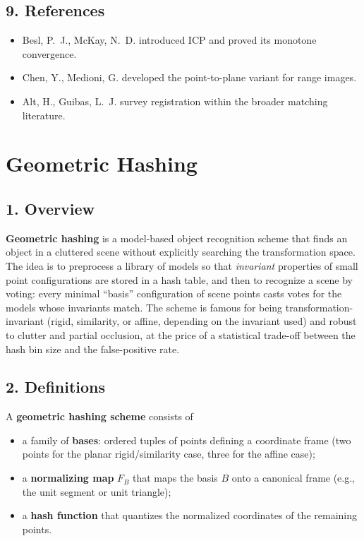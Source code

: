 \subsection{9. References}

\begin{itemize}
\item Besl, P.~J., McKay, N.~D. \cite{besl1992} introduced ICP and proved
  its monotone convergence.
\item Chen, Y., Medioni, G. \cite{chen1992} developed the point-to-plane
  variant for range images.
\item Alt, H., Guibas, L.~J. \cite{alt1999} survey registration within the
  broader matching literature.
\end{itemize}


\section{Geometric Hashing}
\label{sec:matching_hashing}

\subsection{1. Overview}

\textbf{Geometric hashing} \cite{wolfson1997} is a model-based object
recognition scheme that finds an object in a cluttered scene without
explicitly searching the transformation space. The idea is to preprocess a
library of models so that \emph{invariant} properties of small point
configurations are stored in a hash table, and then to recognize a scene by
voting: every minimal ``basis'' configuration of scene points casts votes for
the models whose invariants match. The scheme is famous for being
transformation-invariant (rigid, similarity, or affine, depending on the
invariant used) and robust to clutter and partial occlusion, at the price of
a statistical trade-off between the hash bin size and the false-positive
rate.

\subsection{2. Definitions}

\begin{definition}\label{def:match_geometric_hashing}
  A \textbf{geometric hashing scheme} consists of
  \begin{itemize}
    \item a family of \textbf{bases}: ordered tuples of points defining a
      coordinate frame (two points for the planar rigid/similarity case,
      three for the affine case);
    \item a \textbf{normalizing map} $F_B$ that maps the basis $B$ onto a
      canonical frame (e.g., the unit segment or unit triangle);
    \item a \textbf{hash function} that quantizes the normalized
      coordinates of the remaining points.
  \end{itemize}
\end{definition}

